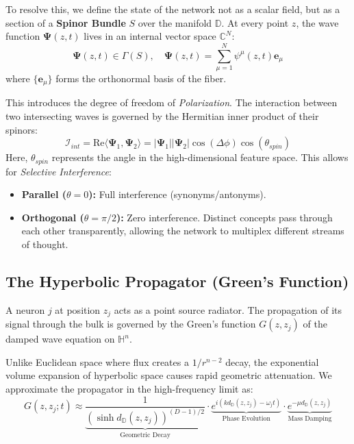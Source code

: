 \documentclass{article}
\begin{document}
To resolve this, we define the state of the network not as a scalar field, but as a section of a \textbf{Spinor Bundle} $S$ over the manifold $\mathbb{D}$. At every point $z$, the wave function $\mathbf{\Psi}(z, t)$ lives in an internal vector space $\mathbb{C}^N$:
\begin{equation}
    \mathbf{\Psi}(z, t) \in \Gamma(S), \quad \mathbf{\Psi}(z, t) = \sum_{\mu=1}^N \psi^\mu(z, t) \mathbf{e}_\mu
\end{equation}
where $\{\mathbf{e}_\mu\}$ forms the orthonormal basis of the fiber.



This introduces the degree of freedom of \textit{Polarization}. The interaction between two intersecting waves is governed by the Hermitian inner product of their spinors:
\begin{equation}
    \mathcal{I}_{int} = \text{Re} \langle \mathbf{\Psi}_1, \mathbf{\Psi}_2 \rangle = |\mathbf{\Psi}_1| |\mathbf{\Psi}_2| \cos(\Delta \phi) \cos(\theta_{spin})
\end{equation}
Here, $\theta_{spin}$ represents the angle in the high-dimensional feature space. This allows for \textit{Selective Interference}:
\begin{itemize}
    \item \textbf{Parallel ($\theta=0$):} Full interference (synonyms/antonyms).
    \item \textbf{Orthogonal ($\theta=\pi/2$):} Zero interference. Distinct concepts pass through each other transparently, allowing the network to multiplex different streams of thought.
\end{itemize}

\subsection{The Hyperbolic Propagator (Green's Function)}
A neuron $j$ at position $z_j$ acts as a point source radiator. The propagation of its signal through the bulk is governed by the Green's function $G(z, z_j)$ of the damped wave equation on $\mathbb{H}^n$.

Unlike Euclidean space where flux creates a $1/r^{n-2}$ decay, the exponential volume expansion of hyperbolic space causes rapid geometric attenuation. We approximate the propagator in the high-frequency limit as:
\begin{equation}
    G(z, z_j; t) \approx \underbrace{\frac{1}{\left(\sinh d_{\mathbb{D}}(z, z_j)\right)^{(D-1)/2}}}_{\text{Geometric Decay}} \cdot \underbrace{e^{i(k d_{\mathbb{D}}(z, z_j) - \omega_j t)}}_{\text{Phase Evolution}} \cdot \underbrace{e^{-\mu d_{\mathbb{D}}(z, z_j)}}_{\text{Mass Damping}}
\end{equation}
\end{document}
